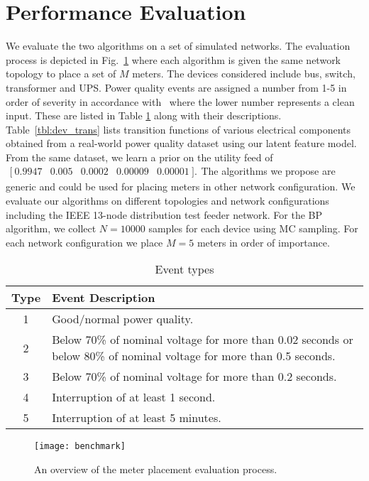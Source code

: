 \section{Performance Evaluation}
\label{sec:experiments}
We evaluate the two algorithms on a set of simulated networks. The evaluation process is depicted in Fig.~\ref{fig:benchmark} where each algorithm is given the same network topology to place a set of $M$ meters. The devices considered include bus, switch, transformer and UPS. Power quality events are assigned a number from 1-5 in order of severity in accordance with~\cite{epri2002} where the lower number represents a clean input. These are listed in Table \ref{EventDescriptions} along with their descriptions. Table~\ref{tbl:dev_trans} lists transition functions of various electrical components obtained from a real-world power quality dataset using our latent feature model. From the same dataset, we learn a prior on the utility feed of $\begin{array}{ccccc}[\ 0.9947 & 0.005 & 0.0002 & 0.00009 & 0.00001\ ].\end{array}$The algorithms we propose are generic and could be used for placing meters in other network configuration. We evaluate our algorithms on different topologies and network configurations including the IEEE 13-node distribution test feeder network. For the BP algorithm, we collect $N=10000$ samples for each device using MC sampling. For each network configuration we place $M=5$ meters in order of importance.

\begin{table}[!p]
\vspace{1cm}
\centering
\caption{Event types}
\label{EventDescriptions}
{\renewcommand{\arraystretch}{1.5}
\begin{tabular}{|c|p{}|}
\hline 
\textbf{Type}  & \textbf{Event Description}\tabularnewline
\hline 
1  & Good/normal power quality.\tabularnewline
2  & Below 70\% of nominal voltage for more than 0.02 seconds or below 80\% of nominal voltage for more than 0.5 seconds.\tabularnewline
3  & Below 70\% of nominal voltage for more than 0.2 seconds.\tabularnewline
4  & Interruption of at least 1 second.\tabularnewline
5  & Interruption of at least 5 minutes.\tabularnewline
\hline 
\end{tabular}}
\end{table}

\begin{figure}[!p]
\centering
\texttt{[image: benchmark]}
\vspace{0.5cm}
\caption{An overview of the meter placement evaluation process. }
\label{fig:benchmark}
\vspace{2cm}
\end{figure}




